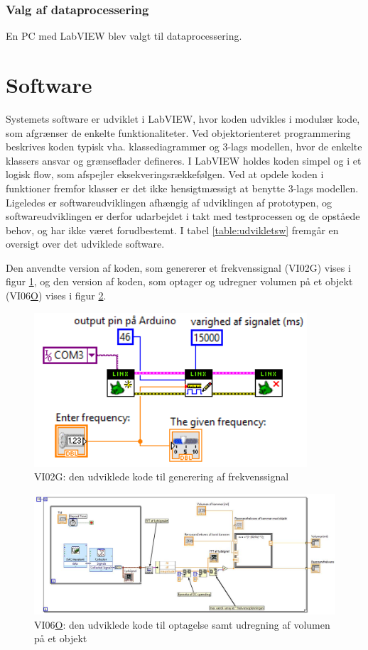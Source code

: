 \subsubsection{Valg af dataprocessering}
En PC med LabVIEW blev valgt til dataprocessering. 

\section{Software}
Systemets software er udviklet i LabVIEW, hvor koden udvikles i modulær kode, som afgrænser de enkelte funktionaliteter. Ved objektorienteret programmering beskrives koden typisk vha. klassediagrammer og 3-lags modellen, hvor de enkelte klassers ansvar og grænseflader defineres. I LabVIEW holdes koden simpel og i et logisk flow, som afspejler eksekveringsrækkefølgen. Ved at opdele koden i funktioner fremfor klasser er det ikke hensigtmæssigt at benytte 3-lags modellen. Ligeledes er softwareudviklingen afhængig af udviklingen af prototypen, og softwareudviklingen er derfor udarbejdet i takt med testprocessen og de opståede behov, og har ikke været forudbestemt. I tabel \ref{table:udvikletsw} fremgår en oversigt over det udviklede software. 

Den anvendte version af koden, som genererer et frekvenssignal (VI02G) vises i figur \ref{fig:swgf02}, og den version af koden, som optager og udregner volumen på et objekt (VI06\underline{O}) vises i figur \ref{fig:swop06}.  

\begin{figure}[htb]
\centering
\includegraphics[width=4in]{genererfrekvenssignal02.PNG}	
\caption{VI02G: den udviklede kode til generering af frekvenssignal}
\label{fig:swgf02}
\end{figure}

\begin{figure}[htb]
\centering
\includegraphics[width=6in]{optagefrekvenssignal06.jpeg}	
\caption{VI06\underline{O}: den udviklede kode til optagelse samt udregning af volumen på et objekt} 
\label{fig:swop06}
\end{figure}



